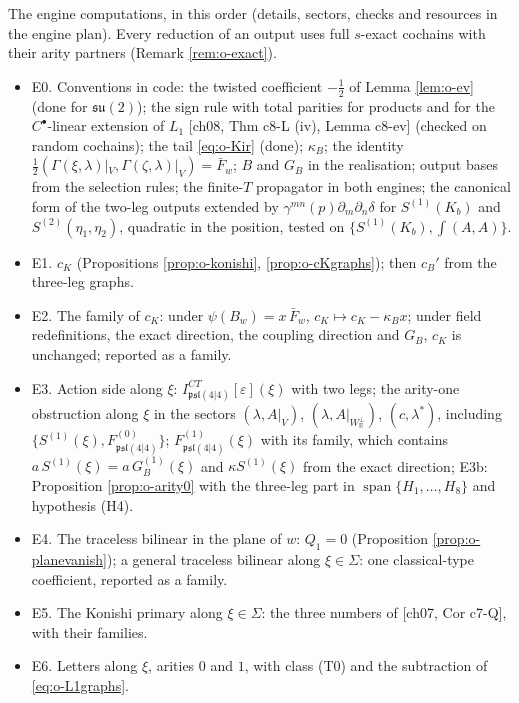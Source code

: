 The engine computations, in this order (details, sectors, checks and resources in the engine plan). Every reduction of an output uses full $s$-exact cochains with their arity partners (Remark \ref{rem:o-exact}).
\begin{itemize}
\item E0. Conventions in code: the twisted coefficient $-\tfrac12$ of Lemma \ref{lem:o-ev} (done for $\mathfrak{su}(2)$); the sign rule with total parities for products and for the $C^\bullet$-linear extension of $L_1$ [ch08, Thm c8-L (iv), Lemma c8-ev] (checked on random cochains); the tail \eqref{eq:o-Kir} (done); $\kappa_B$; the identity $\tfrac12(\Gamma(\xi,\lambda)|_V,\Gamma(\zeta,\lambda)|_V)=\bar F_w$; $B$ and $G_B$ in the realisation; output bases from the selection rules; the finite-$T$ propagator in both engines; the canonical form of the two-leg outputs extended by $\gamma^{mn}(p)\partial_m\partial_n\delta$ for $S^{(1)}(K_b)$ and $S^{(2)}(\eta_1,\eta_2)$, quadratic in the position, tested on $\{S^{(1)}(K_b),\int(A,A)\}$.
\item E1. $c_K$ (Propositions \ref{prop:o-konishi}, \ref{prop:o-cKgraphs}); then $c_B'$ from the three-leg graphs.
\item E2. The family of $c_K$: under $\psi(B_w)=x\,\bar F_w$, $c_K\mapsto c_K-\kappa_Bx$; under field redefinitions, the exact direction, the coupling direction and $G_B$, $c_K$ is unchanged; reported as a family.
\item E3. Action side along $\xi$: $I^{CT}_{\mathfrak{psl}(4|4)}[\varepsilon](\xi)$ with two legs; the arity-one obstruction along $\xi$ in the sectors $(\lambda,A|_V)$, $(\lambda,A|_{W_{\mathbb R}^\perp})$, $(c,\lambda^*)$, including $\{S^{(1)}(\xi),F^{(0)}_{\mathfrak{psl}(4|4)}\}$; $F^{(1)}_{\mathfrak{psl}(4|4)}(\xi)$ with its family, which contains $a\,S^{(1)}(\xi)=a\,G_B^{(1)}(\xi)$ and $\kappa S^{(1)}(\xi)$ from the exact direction; E3b: Proposition \ref{prop:o-arity0} with the three-leg part in $\operatorname{span}\{H_1,\dots,H_8\}$ and hypothesis (H4).
\item E4. The traceless bilinear in the plane of $w$: $Q_1=0$ (Proposition \ref{prop:o-planevanish}); a general traceless bilinear along $\xi\in\Sigma$: one classical-type coefficient, reported as a family.
\item E5. The Konishi primary along $\xi\in\Sigma$: the three numbers of [ch07, Cor c7-Q], with their families.
\item E6. Letters along $\xi$, arities $0$ and $1$, with class (T0) and the subtraction of \eqref{eq:o-L1graphs}.

\end{itemize}
